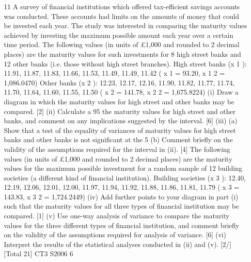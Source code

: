 \documentclass[a4paper,12pt]{article}
\begin{document}
\begin{enumerate}
11
A survey of financial institutions which offered tax-efficient savings accounts was
conducted. These accounts had limits on the amounts of money that could be
invested each year. The study was interested in comparing the maturity values
achieved by investing the maximum possible amount each year over a certain time
period.
The following values (in units of £1,000 and rounded to 2 decimal places) are the
maturity values for such investments for 8 high street banks and 12 other banks (i.e.
those without high street branches).
High street banks (x 1 ): 11.91, 11.87, 11.83, 11.66, 11.53, 11.49, 11.49, 11.42
( x 1 = 93.20, x 1 2 = 1,086.0470)
Other banks (x 2 ): 12.23, 12.17, 12.16, 11.90, 11.82, 11.77, 11.74, 11.70, 11.64, 11.60,
11.55, 11.50
( x 2 = 141.78, x 2 2 = 1,675.8224)
(i) Draw a diagram in which the maturity values for high street and other banks
may be compared.
[2]
(ii) Calculate a 95%
the maturity values for high street and other banks, and comment on any
implications suggested by the interval.
[6]
(iii) (a)
Show that a test of the equality of variances of maturity values for high
street banks and other banks is not significant at the 5%
(b)
Comment briefly on the validity of the assumptions required for the
interval in (ii).
[4]
The following values (in units of £1,000 and rounded to 2 decimal places) are the
maturity values for the maximum possible investment for a random sample of 12
building societies (a different kind of financial institution).
Building societies (x 3 ): 12.40, 12.19, 12.06, 12.01, 12.00, 11.97, 11.94, 11.92, 11.88,
11.86, 11.81, 11.79
( x 3 = 143.83, x 3 2 = 1,724.2449)
(iv) Add further points to your diagram in part (i) such that the maturity values for
all three types of financial institution may be compared.
[1]
(v) Use one-way analysis of variance to compare the maturity values for the three
different types of financial institution, and comment briefly on the validity of
the assumptions required for analysis of variance.
[6]
(vi) Interpret the results of the statistical analyses conducted in (ii) and (v).
[2/]
[Total 21]
CT3 S2006
6


\end{enumerate}
\end{document}
